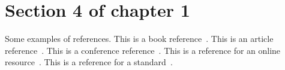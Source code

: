 \section{Section 4 of chapter 1}\label{sect:1_4} 
Some examples of references. 
This is a book reference~\cite{book1}.  
This is an article reference~\cite{article1}.  
This is a conference reference~\cite{conference1}.  
This is a reference for an online resource~\cite{online1}.  
This is a reference for a standard~\cite{standard1}.  




